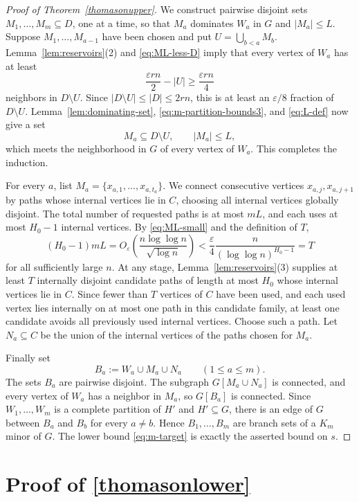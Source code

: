 \documentclass{article}
\newcommand{\eps}{\varepsilon}
\begin{document}
\begin{proof}[Proof of Theorem~\ref{thomasonupper}]
We construct pairwise disjoint sets $M_1,\dots,M_m\subseteq D$, one at a time, so that $M_a$ dominates $W_a$ in $G$ and $|M_a|\le L$.  Suppose $M_1,\dots,M_{a-1}$ have been chosen and put $U=\bigcup_{b<a}M_b$.  Lemma~\ref{lem:reservoirs}(2) and \eqref{eq:ML-less-D} imply that every vertex of $W_a$ has at least
\[
 \frac{\eps rn}{2}-|U|\ge\frac{\eps rn}{4}
\]
neighbors in $D\setminus U$.  Since $|D\setminus U|\le|D|\le2rn$, this is at least an $\eps/8$ fraction of $D\setminus U$.  Lemma~\ref{lem:dominating-set}, \eqref{eq:m-partition-bounds3}, and \eqref{eq:L-def} now give a set
\[
 M_a\subseteq D\setminus U,
 \qquad |M_a|\le L,
\]
which meets the neighborhood in $G$ of every vertex of $W_a$.  This completes the induction.

For every $a$, list $M_a=\{x_{a,1},\dots,x_{a,t_a}\}$.  We connect consecutive vertices $x_{a,j},x_{a,j+1}$ by paths whose internal vertices lie in $C$, choosing all internal vertices globally disjoint.  The total number of requested paths is at most $mL$, and each uses at most $H_0-1$ internal vertices.  By \eqref{eq:ML-small} and the definition of $T$,
\begin{equation}\label{eq:used-C-less-T}
 (H_0-1)mL
 =O_\eps\left(\frac{n\log\log n}{\sqrt{\log n}}\right)
 <\frac\eps4\frac{n}{(\log\log n)^{H_0-1}}
 =T
\end{equation}
for all sufficiently large $n$.
At any stage, Lemma~\ref{lem:reservoirs}(3) supplies at least $T$ internally disjoint candidate paths of length at most $H_0$ whose internal vertices lie in $C$.  Since fewer than $T$ vertices of $C$ have been used, and each used vertex lies internally on at most one path in this candidate family, at least one candidate avoids all previously used internal vertices.  Choose such a path.  Let $N_a\subseteq C$ be the union of the internal vertices of the paths chosen for $M_a$.

Finally set
\[
 B_a:=W_a\cup M_a\cup N_a
 \qquad(1\le a\le m).
\]
The sets $B_a$ are pairwise disjoint.  The subgraph $G[M_a\cup N_a]$ is connected, and every vertex of $W_a$ has a neighbor in $M_a$, so $G[B_a]$ is connected.  Since $W_1,\dots,W_m$ is a complete partition of $H'$ and $H'\subseteq G$, there is an edge of $G$ between $B_a$ and $B_b$ for every $a\ne b$.  Hence $B_1,\dots,B_m$ are branch sets of a $K_m$ minor of $G$.  The lower bound \eqref{eq:m-target} is exactly the asserted bound on $s$.
\end{proof}

\section{Proof of \cref{thomasonlower}}
\end{document}
